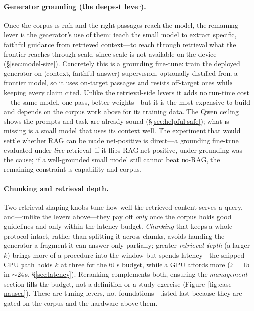 \paragraph{Generator grounding (the deepest lever).} Once the corpus is rich and
the right passages reach the model, the remaining lever is the generator's use of
them: teach the small model to extract specific, faithful guidance from retrieved
context---to reach through retrieval what the frontier reaches through scale,
since scale is not available on the device (\S\ref{sec:model-size}). Concretely
this is a grounding fine-tune: train the deployed generator on
(context, faithful-answer) supervision, optionally distilled from a frontier
model, so it uses on-target passages and resists off-target ones while keeping
every claim cited. Unlike the retrieval-side levers it adds no run-time
cost---the same model, one pass, better weights---but it is the most expensive to
build and depends on the corpus work above for its training data. The Qwen
ceiling shows the prompts and task are already sound (\S\ref{sec:helpful-safe});
what is missing is a small model that uses its context well. The experiment that
would settle whether RAG can be made net-positive is direct---a grounding
fine-tune evaluated under \emph{live} retrieval: if it flips RAG net-positive,
under-grounding was the cause; if a well-grounded small model still cannot beat
no-RAG, the remaining constraint is capability and corpus.

\paragraph{Chunking and retrieval depth.} Two retrieval-shaping knobs tune how
well the retrieved content serves a query, and---unlike the levers above---they
pay off \emph{only} once the corpus holds good guidelines and only within the
latency budget. \emph{Chunking} that keeps a whole protocol intact, rather than
splitting it across chunks, avoids handing the generator a fragment it can answer
only partially; greater \emph{retrieval depth} (a larger $k$) brings more of a
procedure into the window but spends latency---the shipped CPU path holds $k$ at
three for the 60\,s budget, while a GPU affords more ($k=15$ in
$\sim$24\,s, \S\ref{sec:latency}). Reranking complements both, ensuring the
\emph{management} section fills the budget, not a definition or a study-exercise
(Figure~\ref{fig:case-nausea}). These are tuning levers, not foundations---listed
last because they are gated on the corpus and the hardware above them.

